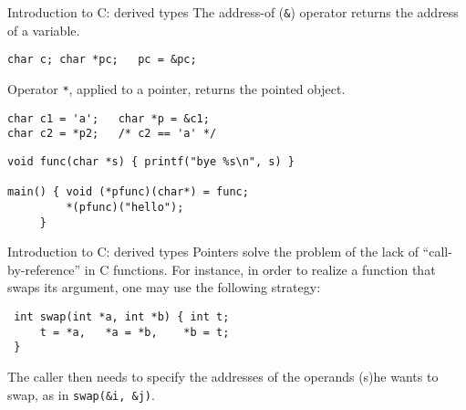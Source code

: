 \begin{frame}[fragile]{Introduction to C: derived types}
The address-of (\verb"&") operator returns the address of a variable.


\vspace{20pt}

\begin{verbatim}
char c; char *pc;   pc = &pc;
\end{verbatim}


\vspace{20pt}

Operator \verb"*", applied to a pointer, returns the pointed object.


\vspace{20pt}

\begin{verbatim}
char c1 = 'a';   char *p = &c1;
char c2 = *p2;   /* c2 == 'a' */
\end{verbatim}


\vspace{20pt}

\begin{verbatim}
void func(char *s) { printf("bye %s\n", s) }

main() { void (*pfunc)(char*) = func;
         *(pfunc)("hello");
     }
\end{verbatim}

\end{frame}
\begin{frame}[fragile]{Introduction to C: derived types}
Pointers solve the problem of the lack of ``call-by-reference''
in C functions. For instance, in order to realize a function that
swaps its argument, one may use the following strategy:


\vspace{20pt}

\begin{verbatim}
 int swap(int *a, int *b) { int t;
     t = *a,   *a = *b,    *b = t;
 }
\end{verbatim}


\vspace{20pt}

The caller then needs to specify the addresses of the operands (s)he wants to
swap, as in \verb"swap(&i, &j)".


\end{frame}

